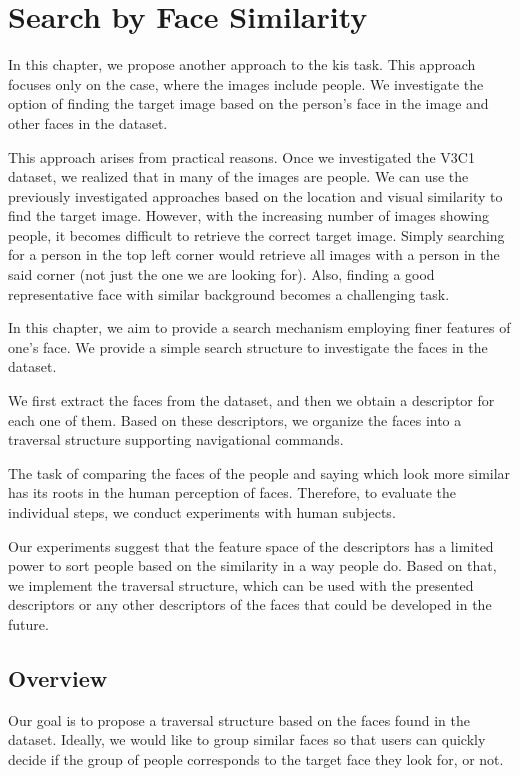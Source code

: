 \chapter{Search by Face Similarity}
\label{ch:face_search}

In this chapter, we propose another approach to the \acrshort{kis} task. This approach focuses only on the case, where the images include people.
We investigate the option of finding the target image based on the person's face in the image and other faces in the dataset.

This approach arises from practical reasons. Once we investigated the V3C1 dataset, we realized that in many of the images are people. We can use the previously investigated approaches based on the location and visual similarity to find the target image. However, with the increasing number of images showing people, it becomes difficult to retrieve the correct target image. Simply searching for a person in the top left corner would retrieve all images with a person in the said corner (not just the one we are looking for). Also, finding a good representative face with similar background becomes a challenging task.

In this chapter, we aim to provide a search mechanism employing finer features of one's face. We provide a simple search structure to investigate the faces in the dataset.

We first extract the faces from the dataset, and then we obtain a descriptor for each one of them. Based on these descriptors, we organize the faces into a traversal structure supporting navigational commands.

The task of comparing the faces of the people and saying which look more similar has its roots in the human perception of faces. Therefore, to evaluate the individual steps, we conduct experiments with human subjects.

Our experiments suggest that the feature space of the descriptors has a limited power to sort people based on the similarity in a way people do. Based on that, we implement the traversal structure, which can be used with the presented descriptors or any other descriptors of the faces that could be developed in the future.


\section{Overview}

Our goal is to propose a traversal structure based on the faces found in the dataset. Ideally, we would like to group similar faces so that users can quickly decide if the group of people corresponds to the target face they look for, or not.


